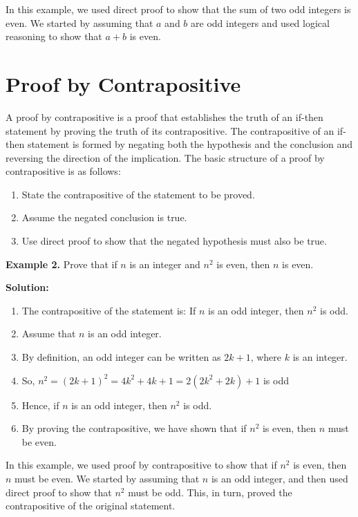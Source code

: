 \documentclass{article}
\begin{document}
In this example, we used direct proof to show that the sum of two odd integers is even. We started by assuming that $a$ and $b$ are odd integers and used logical reasoning to show that $a+b$ is even.

\section{Proof by Contrapositive}

A proof by contrapositive is a proof that establishes the truth of an if-then statement by proving the truth of its contrapositive. The contrapositive of an if-then statement is formed by negating both the hypothesis and the conclusion and reversing the direction of the implication. The basic structure of a proof by contrapositive is as follows:

\begin{enumerate}
\item State the contrapositive of the statement to be proved.
\item Assume the negated conclusion is true.
\item Use direct proof to show that the negated hypothesis must also be true.
\end{enumerate}

\noindent\textbf{Example 2.} Prove that if $n$ is an integer and $n^2$ is even, then $n$ is even.

\noindent\textbf{Solution:}

\begin{enumerate}
\item The contrapositive of the statement is: If $n$ is an odd integer, then $n^2$ is odd.
\item Assume that $n$ is an odd integer.
\item By definition, an odd integer can be written as $2k+1$, where $k$ is an integer.
\item So, $n^2=(2k+1)^2=4k^2+4k+1=2(2k^2+2k)+1$ is odd
\item Hence, if $n$ is an odd integer, then $n^2$ is odd.
\item By proving the contrapositive, we have shown that if $n^2$ is even, then $n$ must be even.
\end{enumerate}

In this example, we used proof by contrapositive to show that if $n^2$ is even, then $n$ must be even. We started by assuming that $n$ is an odd integer, and then used direct proof to show that $n^2$ must be odd. This, in turn, proved the contrapositive of the original statement.
\end{document}
